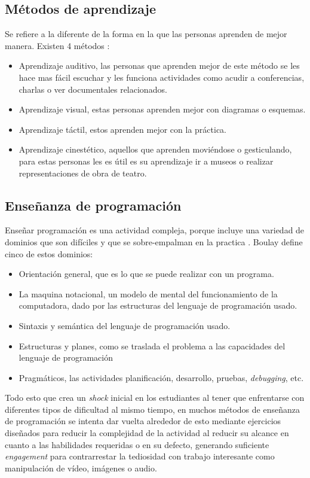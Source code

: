 \subsection{Métodos de aprendizaje}
Se refiere a la diferente de la forma en la que las personas aprenden de mejor manera. Existen 4 métodos \cite{metodos_aprendizaje}: 
\begin{itemize}
    \item Aprendizaje auditivo, las personas que aprenden mejor de este método se les hace mas fácil escuchar y les funciona actividades como acudir a conferencias, charlas o ver documentales relacionados.
    \item Aprendizaje visual, estas personas aprenden mejor con diagramas o esquemas.
    \item Aprendizaje táctil, estos aprenden mejor con la práctica.
    \item Aprendizaje cinestético, aquellos que aprenden moviéndose o gesticulando, para estas personas les es útil es su aprendizaje ir a museos o realizar representaciones de obra de teatro.
\end{itemize}

\subsection{Enseñanza de programación}
Enseñar programación es una actividad compleja, porque incluye una variedad de dominios que son difíciles y que se sobre-empalman en la practica \cite{Robins2003}. Boulay define cinco de estos dominios:
\begin{itemize}
    \item Orientación general, que es lo que se puede realizar con un programa.
    \item La maquina notacional, un modelo de mental del funcionamiento de la computadora, dado por las estructuras del lenguaje de programación usado.
    \item Sintaxis y semántica del lenguaje de programación usado.
    \item Estructuras y planes, como se traslada el problema a las capacidades del lenguaje de programación
    \item Pragmáticos, las actividades planificación, desarrollo, pruebas, \textit{debugging}, etc. 
\end{itemize}
Todo esto que crea un \textit{shock} inicial en los estudiantes al tener que enfrentarse con diferentes tipos de dificultad al mismo tiempo, en muchos métodos de enseñanza de programación se intenta dar vuelta alrededor de esto mediante ejercicios diseñados para reducir la complejidad de la actividad al reducir su alcance en cuanto a las habilidades requeridas o en su defecto, generando suficiente \textit{engagement} para contrarrestar la tediosidad con trabajo interesante como manipulación de vídeo, imágenes o audio.

